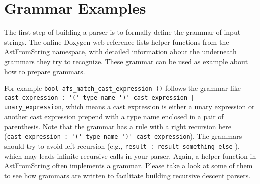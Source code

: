 \section{Grammar Examples}
The first step of  building a parser is to formally define the grammar of input strings. 
The online Doxygen web reference lists helper functions from the AstFromString namespace, with detailed information about the underneath grammars they try to recognize. 
These grammar can be used as example about how to prepare grammars. 

For example \lstinline{bool afs_match_cast_expression ()} follows the grammar like \lstinline {cast_expression : '(' type_name ')' cast_expression | unary_expression}, which means a cast expression is either a unary expression or another cast expression prepend with a type name enclosed in a pair of parenthesis. Note that the grammar has a rule with a right recursion here (\lstinline {cast_expression : '(' type_name ')' cast_expression}). 
The grammars should try to avoid left recursion (e.g., \lstinline{result : result something_else} ), which may leads infinite recursive calls in your parser.  
Again, a helper function in AstFromString often implements a grammar. Please take a look at some of them to see how grammars are written to facilitate building recursive descent parsers.  


